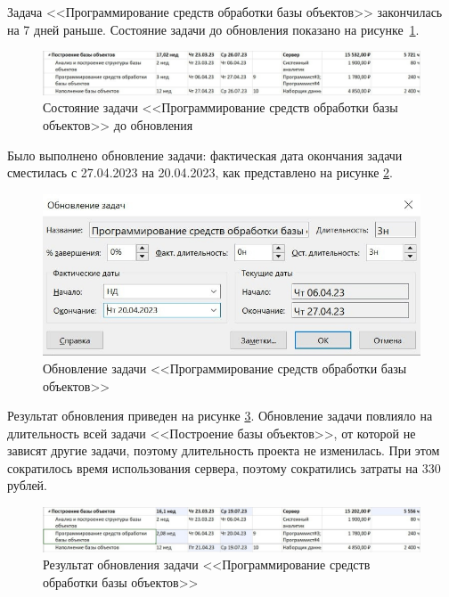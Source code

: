 Задача <<Программирование средств обработки базы объектов>> закончилась на 7 дней раньше. Состояние задачи до обновления показано на рисунке~\ref{img:task2-before}.

\begin{figure}[H]
	\begin{center}
		\includegraphics[scale=0.3]{inc/img/task2-before.jpg}
	\end{center}
	\captionsetup{justification=centering}
	\caption{Состояние задачи <<Программирование средств обработки базы объектов>> до обновления}
	\label{img:task2-before}
\end{figure}

Было выполнено обновление задачи: фактическая дата окончания задачи сместилась с 27.04.2023 на 20.04.2023, как представлено на рисунке \ref{img:task2}.

\begin{figure}[H]
	\begin{center}
		\includegraphics[scale=0.3]{inc/img/task2.jpg}
	\end{center}
	\captionsetup{justification=centering}
	\caption{Обновление задачи <<Программирование средств обработки базы объектов>>}
	\label{img:task2}
\end{figure}

Результат обновления приведен на рисунке \ref{img:task2-result}. Обновление задачи повлияло на длительность всей задачи <<Построение базы объектов>>, от которой не зависят другие задачи, поэтому длительность проекта не изменилась. При этом сократилось время использования сервера, поэтому сократились затраты на 330 рублей.

\begin{figure}[H]
	\begin{center}
		\includegraphics[scale=0.3]{inc/img/task2-result.jpg}
	\end{center}
	\captionsetup{justification=centering}
	\caption{Результат обновления задачи <<Программирование средств обработки базы объектов>>}
	\label{img:task2-result}
\end{figure}

